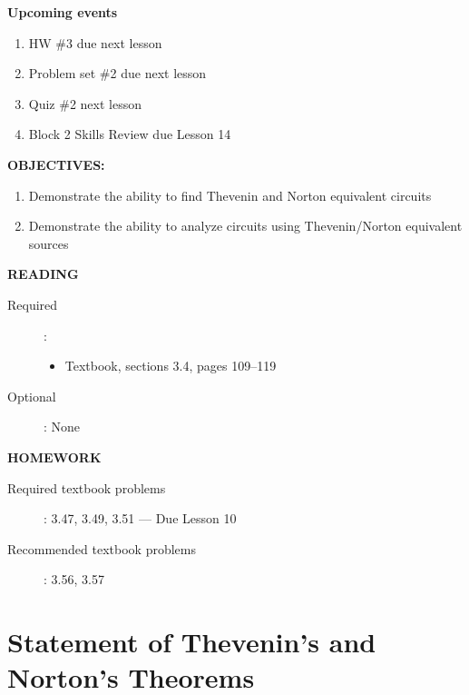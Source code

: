 \documentclass{handout}
\begin{document}
\maketitle

\textbf{Upcoming events}
\begin{enumerate}
\item HW \#3 due next lesson
\item Problem set \#2 due next lesson
\item Quiz \#2 next lesson
\item Block 2 Skills Review due Lesson 14
\end{enumerate}

\textbf{OBJECTIVES:}
\begin{enumerate}
\item Demonstrate the ability to find Thevenin and Norton equivalent circuits
\item Demonstrate the ability to analyze circuits using Thevenin/Norton equivalent sources
\end{enumerate}

\textbf{READING}
\begin{description}
\item [Required]:
\begin{itemize}
\item  Textbook, sections 3.4, pages 109--119
\end{itemize}
\item [Optional]: None
\end{description}

\textbf{HOMEWORK}
\begin{description}
\item [Required textbook problems]: 3.47, 3.49, 3.51 --- Due Lesson 10
\item [Recommended textbook problems]: 3.56, 3.57
\end{description}

\section{Statement of Thevenin's and Norton's Theorems}
\end{document}
